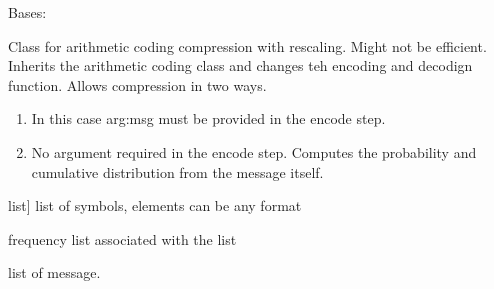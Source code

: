 \documentclass[letterpaper,10pt,english]{sphinxmanual}
\begin{document}
\begin{fulllineitems}
\label{\detokenize{arithmetic_coding:arithmetic_coding.RangeCoding}}
\pysigstartsignatures
{}
\pysigstopsignatures
\sphinxAtStartPar
Bases: {\hyperref[\detokenize{arithmetic_coding:arithmetic_coding.ArithmeticCoding}]{}}

\sphinxAtStartPar
Class for arithmetic coding compression with rescaling. Might not be efficient. Inherits the arithmetic coding class and changes teh encoding and decodign function. Allows compression in two ways.
\begin{enumerate}
%
\item {} \begin{description}
\sphinxAtStartPar
In this case arg:msg must be provided in the encode step.

\end{description}

\item {} \begin{description}
\sphinxAtStartPar
No argument required in the encode step. 
Computes the probability and cumulative distribution from the message itself.

\end{description}

\end{enumerate}
\begin{description}
\begin{description}
\sphinxlineitem{symbols}{[}list{]}
\sphinxAtStartPar
list of symbols, elements can be any format

\sphinxAtStartPar
frequency list associated with the list

\sphinxAtStartPar
list of message.

\end{description}


\end{description}
\end{fulllineitems}
\end{document}
